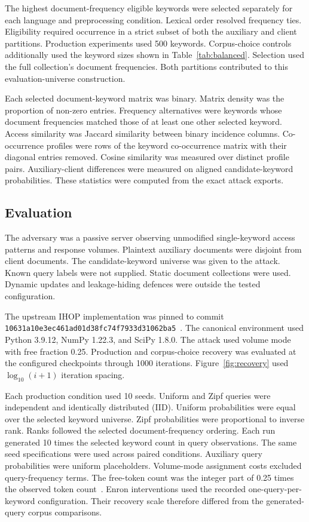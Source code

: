 \documentclass[pdflatex,sn-mathphys-num]{sn-jnl}%
\theoremstyle{thmstyleone}%
\theoremstyle{thmstyletwo}%
\theoremstyle{thmstylethree}%
\newcommand{\Keywords}{500}
\newcommand{\SeedCount}{10}
\newcommand{\FinalIterations}{1000}
\newcommand{\QueriesPerKeyword}{10}
\newcommand{\FreeFraction}{0.25}
\newcommand{\PythonVersion}{3.9.12}
\newcommand{\NumpyVersion}{1.22.3}
\newcommand{\ScipyVersion}{1.8.0}
\newcommand{\CommitID}{\texttt{1063\allowbreak{}1a10\allowbreak{}e3ec\allowbreak{}461a\allowbreak{}d01d\allowbreak{}38fc\allowbreak{}74f7\allowbreak{}933d\allowbreak{}3106\allowbreak{}2ba5}}
\begin{document}
The highest document-frequency eligible keywords were selected separately for each language and preprocessing condition. Lexical order resolved frequency ties. Eligibility required occurrence in a strict subset of both the auxiliary and client partitions. Production experiments used \Keywords{} keywords. Corpus-choice controls additionally used the keyword sizes shown in Table~\ref{tab:balanced}. Selection used the full collection's document frequencies. Both partitions contributed to this evaluation-universe construction.

Each selected document-keyword matrix was binary. Matrix density was the proportion of non-zero entries. Frequency alternatives were keywords whose document frequencies matched those of at least one other selected keyword. Access similarity was Jaccard similarity between binary incidence columns. Co-occurrence profiles were rows of the keyword co-occurrence matrix with their diagonal entries removed. Cosine similarity was measured over distinct profile pairs. Auxiliary-client differences were measured on aligned candidate-keyword probabilities. These statistics were computed from the exact attack exports.

\subsection{Evaluation}
The adversary was a passive server observing unmodified single-keyword access patterns and response volumes. Plaintext auxiliary documents were disjoint from client documents. The candidate-keyword universe was given to the attack. Known query labels were not supplied. Static document collections were used. Dynamic updates and leakage-hiding defences were outside the tested configuration.

The upstream IHOP implementation was pinned to commit \CommitID{}~\cite{ihopcode}. The canonical environment used Python \PythonVersion{}, NumPy \NumpyVersion{}, and SciPy \ScipyVersion{}. The attack used volume mode with free fraction \FreeFraction{}. Production and corpus-choice recovery was evaluated at the configured checkpoints through \FinalIterations{} iterations. Figure~\ref{fig:recovery} used $\log_{10}(i+1)$ iteration spacing.

Each production condition used \SeedCount{} seeds. Uniform and Zipf queries were independent and identically distributed (IID). Uniform probabilities were equal over the selected keyword universe. Zipf probabilities were proportional to inverse rank. Ranks followed the selected document-frequency ordering. Each run generated \QueriesPerKeyword{} times the selected keyword count in query observations. The same seed specifications were used across paired conditions. Auxiliary query probabilities were uniform placeholders. Volume-mode assignment costs excluded query-frequency terms. The free-token count was the integer part of \FreeFraction{} times the observed token count~\cite{ihopcode}. Enron interventions used the recorded one-query-per-keyword configuration. Their recovery scale therefore differed from the generated-query corpus comparisons.
\end{document}
